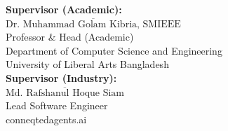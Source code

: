 \documentclass[12pt, oneside, a4paper]{book}
\begin{document}
\textbf{Supervisor (Academic):}\\[2cm]
$\overline{\text{Dr.\ Muhammad Golam Kibria, SMIEEE}}$\\
Professor \& Head (Academic)\\
Department of Computer Science and Engineering\\
University of Liberal Arts Bangladesh\\[1.5cm]

\textbf{Supervisor (Industry):}\\[2cm]
$\overline{\text{Md.\ Rafshanul Hoque Siam}}$\\
Lead Software Engineer\\
conneqtedagents.ai

\thispagestyle{empty}
\cleardoublepage

\pagestyle{phdthesis}
\frontmatter
\end{document}
